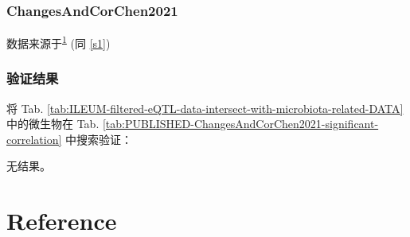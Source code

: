 \documentclass[
]{article}
\begin{document}
\hypertarget{changesandcorchen2021}{%
\subsubsection{ChangesAndCorChen2021}\label{changesandcorchen2021}}

数据来源于\textsuperscript{\protect\hyperlink{ref-ChangesAndCorChen2021}{1}} (同 \ref{s1})

\hypertarget{ux9a8cux8bc1ux7ed3ux679c-1}{%
\subsubsection{验证结果}\label{ux9a8cux8bc1ux7ed3ux679c-1}}

将 Tab. \ref{tab:ILEUM-filtered-eQTL-data-intersect-with-microbiota-related-DATA} 中的微生物在 Tab. \ref{tab:PUBLISHED-ChangesAndCorChen2021-significant-correlation} 中搜索验证：

无结果。

\hypertarget{bibliography}{%
\section*{Reference}\label{bibliography}}
\end{document}
